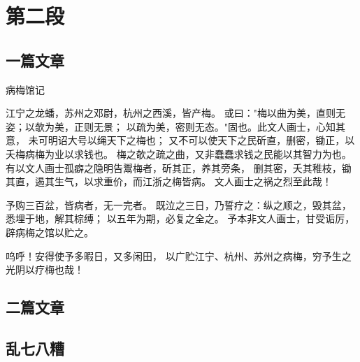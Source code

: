 \documentclass[12pt]{ctexart}
\begin{document}
\section{第二段}
\subsection{一篇文章}
病梅馆记

江宁之龙蟠，苏州之邓尉，杭州之西溪，皆产梅。
或曰："梅以曲为美，直则无姿；以欹为美，正则无景；
以疏为美，密则无态。"固也。此文人画士，心知其意，
未可明诏大号以绳天下之梅也；
又不可以使天下之民斫直，删密，锄正，以夭梅病梅为业以求钱也。
梅之欹之疏之曲，又非蠢蠢求钱之民能以其智力为也。
有以文人画士孤癖之隐明告鬻梅者，斫其正，养其旁条，
删其密，夭其稚枝，锄其直，遏其生气，以求重价，而江浙之梅皆病。
文人画士之祸之烈至此哉！

予购三百盆，皆病者，无一完者。
既泣之三日，乃誓疗之：纵之顺之，毁其盆，悉埋于地，解其棕缚；
以五年为期，必复之全之。
予本非文人画士，甘受诟厉，辟病梅之馆以贮之。

呜呼！安得使予多暇日，又多闲田，
以广贮江宁、杭州、苏州之病梅，穷予生之光阴以疗梅也哉！
\subsection{二篇文章}
\zhlipsum[4-10][name=zhufu]
\newpage  
\subsection{乱七八糟}
\lstset{language = SQL}
\end{document}
